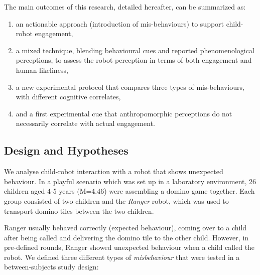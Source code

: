 \documentclass[letterpaper, 10pt, conference]{ieeeconf}
\begin{document}
The main outcomes of this research, detailed hereafter, can be summarized as:

\begin{enumerate}
    \item an actionable approach (introduction of mis-behaviours) to support
        child-robot engagement,
    \item a mixed technique, blending behavioural cues and reported
        phenomenological perceptions, to assess the robot perception in terms of
        both engagement and human-likeliness,

    \item a new experimental protocol that compares three types of
        mis-behaviours, with different cognitive correlates,

    \item and a first experimental cue that anthropomorphic perceptions do not
        necessarily correlate with actual engagement.
\end{enumerate}


\subsection{Design and Hypotheses}

We analyse child-robot interaction with a robot that shows unexpected behaviour.
In a playful scenario which was set up in a laboratory environment, 26 children
aged 4-5 years (M=4.46) were assembling a domino game together. Each group
consisted of two children and the \emph{Ranger} robot, which was used to
transport domino tiles between the two children.

Ranger usually behaved correctly (expected behaviour), coming over to a child
after being called and delivering the domino tile to the other child. However,
in pre-defined rounds, Ranger showed unexpected behaviour when a child called the
robot. We defined three different types of \textit{misbehaviour} that were tested
in a between-subjects study design:
\end{document}
